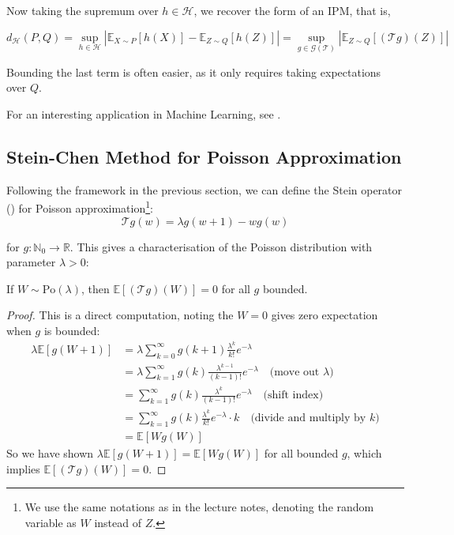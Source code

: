 \documentclass{article}
\begin{document}
Now taking the supremum over $h \in \mathcal{H}$, we recover the form of an IPM, that is,

\begin{equation}\label{eq:stein_ipm_relation}
    d_{\mathcal{H}}(P, Q) = \sup_{h \in \mathcal{H}} |\mathbb{E}_{X\sim P}[h(X)] - \mathbb{E}_{Z\sim Q}[h(Z)]| = \sup_{g \in \mathcal{G}(\mathcal{T})} |\mathbb{E}_{Z\sim Q}[(\mathcal{T}g)(Z)]|
\end{equation}

Bounding the last term is often easier, as it only requires taking expectations over $Q$.

\begin{unexaminable}
    For an interesting application in Machine Learning, see \citep{pmlr-v119-grathwohl20a}.
\end{unexaminable}



\subsection{Stein-Chen Method for Poisson Approximation}  
Following the framework in the previous section, we can define the Stein operator () for Poisson approximation\footnote{We use the same notations as in the lecture notes, denoting the random variable as $W$ instead of $Z$.}:
\begin{equation}
    \mathcal{T}g(w) = \lambda g(w+1) - wg(w)
\end{equation}

for $g: \mathbb{N}_0 \to \mathbb{R}$. This gives a characterisation of the Poisson distribution with parameter $\lambda>0$:

\begin{proposition}
    \label{prop: direction1 poisson}
    If $W\sim \text{Po}(\lambda)$, then $\mathbb{E}[(\mathcal{T}g)(W)]=0$ for all $g$ bounded.
\end{proposition}

\begin{proof}
This is a direct computation, noting the $W=0$ gives zero expectation when $g$ is bounded:  
    \begin{align*}
        \lambda \mathbb{E}[g(W+1)] &= \lambda \sum_{k=0}^\infty g(k+1) \frac{\lambda^k}{k!} e^{-\lambda}\\
        &= \lambda \sum_{k=1}^\infty g(k) \frac{\lambda^{k-1}}{(k-1)!} e^{-\lambda} \quad \text{(move out $\lambda$)}\\
        &= \sum_{k=1}^\infty g(k) \frac{\lambda^k}{(k-1)!} e^{-\lambda} \quad \text{(shift index)}
        \\
        &= \sum_{k=1}^\infty g(k) \frac{\lambda^k}{k!} e^{-\lambda} \cdot k \quad \text{(divide and multiply by $k$)}\\
        &= \mathbb{E}[Wg(W)]
    \end{align*}
So we have shown $\lambda\mathbb{E}[g(W+1)] = \mathbb{E}[Wg(W)]$ for all bounded $g$, which implies $\mathbb{E}[(\mathcal{T}g)(W)]=0$.  
\end{proof}
\end{document}
